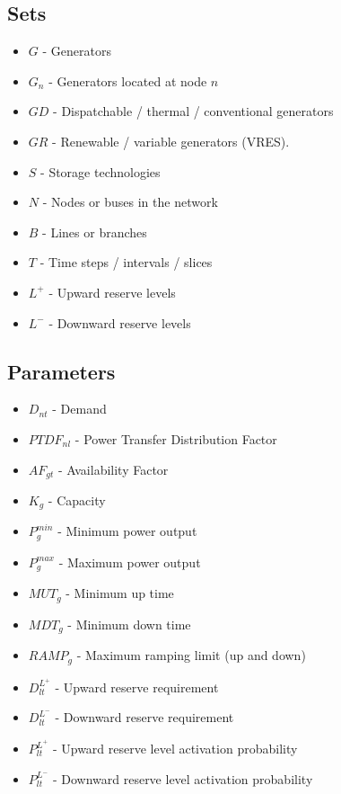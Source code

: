 \documentclass[number,times]{elsarticle}
\begin{document}
\subsection{Sets}

\begin{itemize}
    \item $G$ - Generators
    \item $G_n$ - Generators located at node $n$
    \item $GD$ - Dispatchable / thermal / conventional generators
    \item $GR$ - Renewable / variable generators (\ac{VRES}).
    \item $S$ - Storage technologies
    \item $N$ - Nodes or buses in the network
    \item $B$ - Lines or branches
    \item $T$ - Time steps / intervals / slices
    \item $L^+$ - Upward reserve levels
    \item $L^-$ - Downward reserve levels
\end{itemize}

\subsection{Parameters}

\begin{itemize}
    \item $D_{nt}$ - Demand
    \item $PTDF_{nl}$ - Power Transfer Distribution Factor
    \item $AF_{gt}$ - Availability Factor
    \item $K_g$ - Capacity
    \item $P^{min}_g$ - Minimum power output
    \item $P^{max}_g$ - Maximum power output
    \item $MUT_g$ - Minimum up time
    \item $MDT_g$ - Minimum down time
    \item $RAMP_g$ - Maximum ramping limit (up and down)
    \item $D^{L^+}_{lt}$ - Upward reserve requirement
    \item $D^{L^-}_{lt}$ - Downward reserve requirement
    \item $P^{L^+}_{lt}$ - Upward reserve level activation probability
    \item $P^{L^-}_{lt}$ - Downward reserve level activation probability
\end{itemize}
\end{document}
